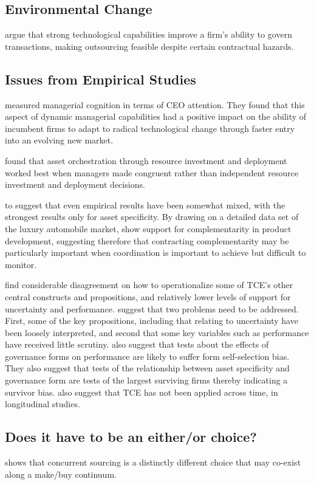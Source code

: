\documentclass[12pt,letterpaper]{article}
\begin{document}
\subsection{Environmental Change}
\cite{Mayer2006} argue that strong technological capabilities improve a firm's ability to govern transactions, making outsourcing feasible despite certain contractual hazards.


\subsection{Issues from Empirical Studies}
\cite{Eggers2009} measured managerial cognition in terms of CEO attention. They found that this aspect of dynamic managerial capabilities had a positive impact on the ability of incumbent firms to adapt to radical technological change through faster entry into an evolving new market.

\cite{Sirmon2009} found that asset orchestration through resource investment and deployment worked best when managers made congruent rather than independent resource investment and deployment decisions.

\cite{David2004} to suggest that even empirical results have been somewhat mixed, with the strongest results only for asset specificity. 
By drawing on a detailed data set of the luxury automobile market, \cite{Novak2009} show support for complementarity in product development, suggesting therefore that contracting complementarity may be particularly important when coordination is important to achieve but difficult to monitor.
 
\cite{David2004} find considerable disagreement on how to operationalize some of TCE's other central constructs and propositions, and relatively lower levels of support for uncertainty and performance. \cite{David2004} suggest that two problems need to be addressed. First, some of the key propositions, including that relating to uncertainty have been loosely interpreted, and second that some key variables such as performance have received little scrutiny. \cite{David2004} also suggest that tests about the effects of governance forms on performance are likely to suffer form self-selection bias. They also suggest that tests of the relationship between asset specificity and governance form are tests of the largest surviving firms thereby indicating a survivor bias. \cite{David2004} also suggest that TCE has not been applied across time, in longitudinal studies. 

\subsection{Does it have to be an either/or choice?}
\cite{Parmigiani2007} shows that concurrent sourcing is a distinctly different choice that may co-exist along a make/buy continuum.
\end{document}
